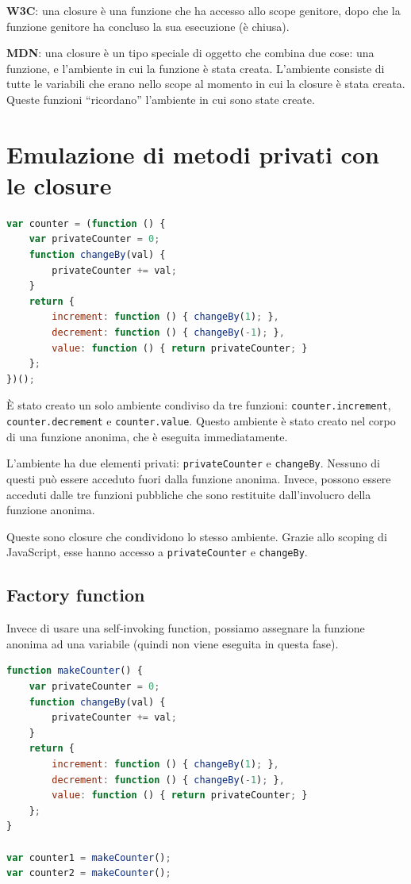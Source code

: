 \textbf{W3C}: una closure è una funzione che ha accesso allo scope genitore, dopo che la funzione genitore ha concluso la sua esecuzione (è chiusa).

\textbf{MDN}: una closure è un tipo speciale di oggetto che combina due cose: una funzione, e l'ambiente in cui la funzione è stata creata. L'ambiente consiste di tutte le variabili che erano nello scope al momento in cui la closure è stata creata. Queste funzioni ``ricordano'' l'ambiente in cui sono state create.

\section{Emulazione di metodi privati con le closure}

\begin{lstlisting}[language=JavaScript, caption=Metodi privati tramite closure]
var counter = (function () {
    var privateCounter = 0;
    function changeBy(val) {
        privateCounter += val;
    }
    return {
        increment: function () { changeBy(1); },
        decrement: function () { changeBy(-1); },
        value: function () { return privateCounter; }
    };
})();
\end{lstlisting}

È stato creato un solo ambiente condiviso da tre funzioni: \texttt{counter.increment}, \texttt{counter.decrement} e \texttt{counter.value}. Questo ambiente è stato creato nel corpo di una funzione anonima, che è eseguita immediatamente.

L'ambiente ha due elementi privati: \texttt{privateCounter} e \texttt{changeBy}. Nessuno di questi può essere acceduto fuori dalla funzione anonima. Invece, possono essere acceduti dalle tre funzioni pubbliche che sono restituite dall'involucro della funzione anonima.

Queste sono closure che condividono lo stesso ambiente. Grazie allo scoping di JavaScript, esse hanno accesso a \texttt{privateCounter} e \texttt{changeBy}.

\subsection{Factory function}

Invece di usare una self-invoking function, possiamo assegnare la funzione anonima ad una variabile (quindi non viene eseguita in questa fase).

\begin{lstlisting}[language=JavaScript]
function makeCounter() {
    var privateCounter = 0;
    function changeBy(val) {
        privateCounter += val;
    }
    return {
        increment: function () { changeBy(1); },
        decrement: function () { changeBy(-1); },
        value: function () { return privateCounter; }
    };
}

var counter1 = makeCounter();
var counter2 = makeCounter();
\end{lstlisting}

